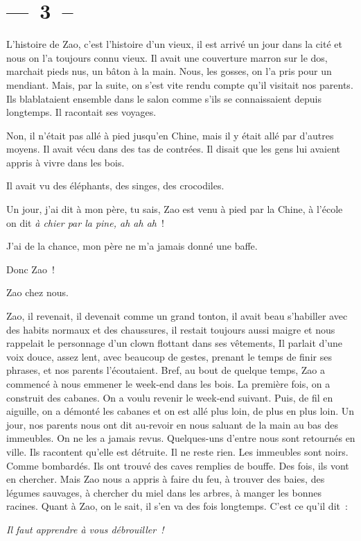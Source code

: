 \documentclass[french,twoside]{book} %
\begin{document}
\section[{— 3 –}]{— 3 –}
\renewcommand{\leftmark}{— 3 –}

\noindent L’histoire de Zao, c’est l’histoire d’un vieux, il est arrivé un jour dans la cité et nous on l’a toujours connu vieux. Il avait une couverture marron sur le dos, marchait pieds nus, un bâton à la main. Nous, les gosses, on l’a pris pour un mendiant. Mais, par la suite, on s’est vite rendu compte qu’il visitait nos parents. Ils blablataient ensemble dans le salon comme s’ils se connaissaient depuis longtemps. Il racontait ses voyages.\par
Non, il n’était pas allé à pied jusqu’en Chine, mais il y était allé par d’autres moyens. Il avait vécu dans des tas de contrées. Il disait que les gens lui avaient appris à vivre dans les bois.\par
Il avait vu des éléphants, des singes, des crocodiles.\par
Un jour, j’ai dit à mon père, tu sais, Zao est venu à pied par la Chine, à l’école on dit \emph{à chier par la pine, ah ah ah} !\par
J’ai de la chance, mon père ne m’a jamais donné une baffe.\par
Donc Zao !\par
Zao chez nous.\par
Zao, il revenait, il devenait comme un grand tonton, il avait beau s’habiller avec des habits normaux et des chaussures, il restait toujours aussi maigre et nous rappelait le personnage d’un clown flottant dans ses vêtements, Il parlait d’une voix douce, assez lent, avec beaucoup de gestes, prenant le temps de finir ses phrases, et nos parents l’écoutaient. Bref, au bout de quelque temps, Zao a commencé à nous emmener le week-end dans les bois. La première fois, on a construit des cabanes. On a voulu revenir le week-end suivant. Puis, de fil en aiguille, on a démonté les cabanes et on est allé plus loin, de plus en plus loin. Un jour, nos parents nous ont dit au-revoir en nous saluant de la main au bas des immeubles. On ne les a jamais revus. Quelques-uns d’entre nous sont retournés en ville. Ils racontent qu’elle est détruite. Il ne reste rien. Les immeubles sont noirs. Comme bombardés. Ils ont trouvé des caves remplies de bouffe. Des fois, ils vont en chercher. Mais Zao nous a appris à faire du feu, à trouver des baies, des légumes sauvages, à chercher du miel dans les arbres, à manger les bonnes racines. Quant à Zao, on le sait, il s’en va des fois longtemps. C’est ce qu’il dit :\par
{\itshape Il faut apprendre à vous débrouiller !}
\end{document}
